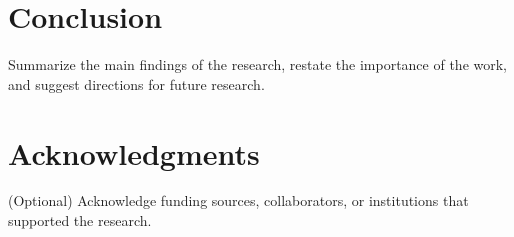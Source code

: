 \documentclass[12pt,a4paper]{article}
\begin{document}
	\section{Conclusion}
	Summarize the main findings of the research, restate the importance of the work, and suggest directions for future research.
	
	\section*{Acknowledgments}
	(Optional) Acknowledge funding sources, collaborators, or institutions that supported the research.
	
	
\end{document}
